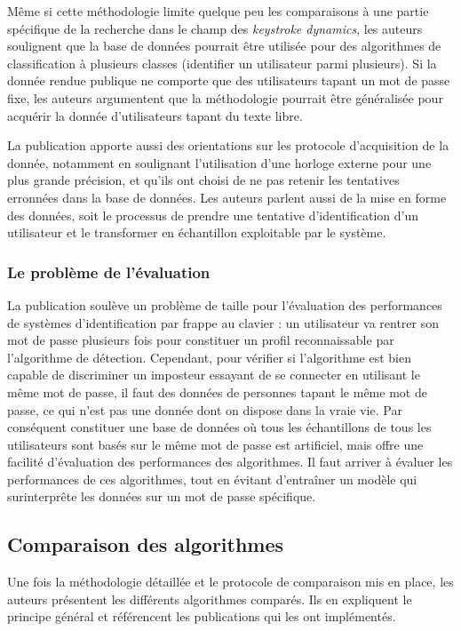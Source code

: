 Même si cette méthodologie limite quelque peu les comparaisons à une partie spécifique de la recherche dans le champ des \textit{keystroke dynamics}, les auteurs soulignent que la base de données pourrait être utilisée pour des algorithmes de classification à plusieurs classes (identifier un utilisateur parmi plusieurs). Si la donnée rendue publique ne comporte que des utilisateurs tapant un mot de passe fixe, les auteurs argumentent que la méthodologie pourrait être généralisée pour acquérir la donnée d'utilisateurs tapant du texte libre.

La publication apporte aussi des orientations sur les protocole d'acquisition de la donnée, notamment en soulignant l'utilisation d'une horloge externe pour une plus grande précision, et qu'ils ont choisi de ne pas retenir les tentatives erronnées dans la base de données. Les auteurs parlent aussi de la mise en forme des données, soit le processus de prendre une tentative d'identification d'un utilisateur et le transformer en échantillon exploitable par le système.

\subsubsection{Le problème de l'évaluation}
La publication soulève un problème de taille pour l'évaluation des performances de systèmes d'identification par frappe au clavier : un utilisateur va rentrer son mot de passe plusieurs fois pour constituer un profil reconnaissable par l'algorithme de détection. Cependant, pour vérifier si l'algorithme est bien capable de discriminer un imposteur essayant de se connecter en utilisant le même mot de passe, il faut des données de personnes tapant le même mot de passe, ce qui n'est pas une donnée dont on dispose dans la vraie vie. Par conséquent constituer une base de données où tous les échantillons de tous les utilisateurs sont basés sur le même mot de passe est artificiel, mais offre une facilité d'évaluation des performances des algorithmes. Il faut arriver à évaluer les performances de ces algorithmes, tout en évitant d'entraîner un modèle qui surinterprête les données sur un mot de passe spécifique.

\subsection{Comparaison des algorithmes}

Une fois la méthodologie détaillée et le protocole de comparaison mis en place, les auteurs présentent les différents algorithmes comparés. Ils en expliquent le principe général et référencent les publications qui les ont implémentés.

